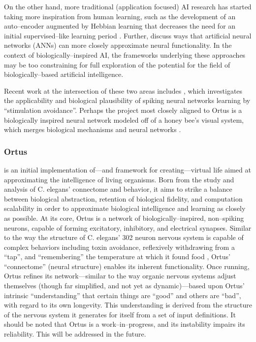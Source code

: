 \documentclass[letterpaper]{article}
\begin{document}
On the other hand, more traditional (application focused) AI research has started taking more inspiration from human learning, such as the development of an auto--encoder augmented by Hebbian learning that decreases the need for an initial supervised--like learning period \citep{Bowren2016}. Further, \citet{Marblestone2016} discuss ways that artificial neural networks (ANNs) can more closely approximate neural functionality.
In the context of biologically--inspired AI, the frameworks underlying these approaches may be too constraining for full exploration of the potential for the field of biologically--based artificial intelligence. 

Recent work at the intersection of these two areas includes \citet{Sinapayen2016}, which investigates the applicability and biological plausibility of spiking neural networks learning by ``stimulation avoidance''. Perhaps the project most closely aligned to Ortus is a biologically inspired neural network modeled off of a honey bee's visual system, which merges biological mechanisms and neural networks \citep{Roper2017}.


\subsubsection{Ortus} is an initial implementation of---and framework for creating---virtual life aimed at approximating the intelligence of living organisms.
Born from the study and analysis of C. elegans' connectome and behavior, it aims to strike a balance between biological abstraction, retention of biological fidelity, and computation scalability in order to approximate biological intelligence and learning as closely as possible.
At its core, Ortus is a network of biologically--inspired, non--spiking neurons, capable of forming excitatory, inhibitory, and electrical synapses.
Similar to the way the structure of C. elegans' 302 neuron nervous system is capable of complex behaviors including toxin avoidance, reflexively withdrawing from a ``tap'', and ``remembering'' the temperature at which it found food \citep{Jarrell2012}, Ortus' ``connectome'' (neural structure) enables its inherent functionality.
Once running, Ortus refines its network---similar to the way organic nervous systems adjust themselves (though far simplified, and not yet as dynamic)---based upon Ortus' intrinsic ``understanding'' that certain things are ``good'' and others are ``bad'', with regard to its own longevity.
This understanding is derived from the structure of the nervous system it generates for itself from a set of input definitions.
It should be noted that Ortus is a work--in--progress, and its instability impairs its reliability. This will be addressed in the future.
\end{document}
